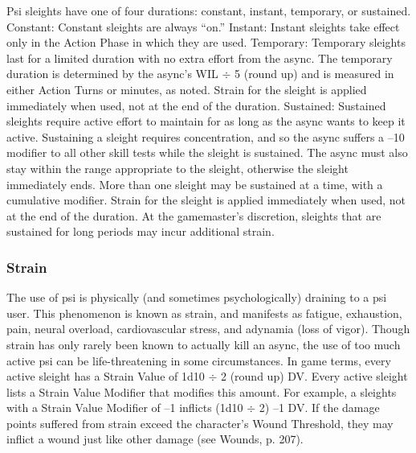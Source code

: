 Psi sleights have one of four durations: constant, instant,
temporary, or sustained.
Constant: Constant sleights are always “on.”
Instant: Instant sleights take effect only in the
Action Phase in which they are used.
Temporary: Temporary sleights last for a limited
duration with no extra effort from the async. The
temporary duration is determined by the async’s WIL
$\div$ 5 (round up) and is measured in either Action Turns
or minutes, as noted. Strain for the sleight is applied
immediately when used, not at the end of the duration.
Sustained: Sustained sleights require active effort
to maintain for as long as the async wants to keep
it active. Sustaining a sleight requires concentration,
and so the async suffers a –10 modifier to all other
skill tests while the sleight is sustained. The async
must also stay within the range appropriate to the
sleight, otherwise the sleight immediately ends. More
than one sleight may be sustained at a time, with a
cumulative modifier. Strain for the sleight is applied
immediately when used, not at the end of the duration.
At the gamemaster’s discretion, sleights that are
sustained for long periods may incur additional strain.

\subsubsection{Strain}

The use of psi is physically (and sometimes psychologically)
draining to a psi user. This phenomenon is
known as strain, and manifests as fatigue, exhaustion,
pain, neural overload, cardiovascular stress, and
adynamia (loss of vigor). Though strain has only
rarely been known to actually kill an async, the use
of too much active psi can be life-threatening in some
circumstances.
In game terms, every active sleight has a Strain
Value of 1d10 $\div$ 2 (round up) DV. Every active sleight
lists a Strain Value Modifier that modifies this amount.
For example, a sleights with a Strain Value Modifier
of –1 inflicts (1d10 $\div$ 2) –1 DV.
If the damage points suffered from strain exceed
the character’s Wound Threshold, they may inflict a
wound just like other damage (see Wounds, p. 207).

